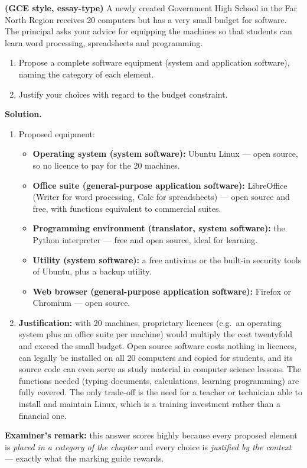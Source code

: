 \documentclass[11pt]{article}
\begin{document}
\begin{exoresolu}
\textbf{(GCE style, essay-type)} A newly created Government High School in the Far North Region receives 20 computers but has a very small budget for software. The principal asks your advice for equipping the machines so that students can learn word processing, spreadsheets and programming.
\begin{enumerate}
\item Propose a complete software equipment (system and application software), naming the category of each element.
\item Justify your choices with regard to the budget constraint.
\end{enumerate}
\tcblower
\textbf{Solution.}
\begin{enumerate}
\item Proposed equipment:
\begin{itemize}
\item \textbf{Operating system (system software):} Ubuntu Linux --- open source, so no licence to pay for the 20 machines.
\item \textbf{Office suite (general-purpose application software):} LibreOffice (Writer for word processing, Calc for spreadsheets) --- open source and free, with functions equivalent to commercial suites.
\item \textbf{Programming environment (translator, system software):} the Python interpreter --- free and open source, ideal for learning.
\item \textbf{Utility (system software):} a free antivirus or the built-in security tools of Ubuntu, plus a backup utility.
\item \textbf{Web browser (general-purpose application software):} Firefox or Chromium --- open source.
\end{itemize}
\item \textbf{Justification:} with 20 machines, proprietary licences (e.g.\ an operating system plus an office suite per machine) would multiply the cost twentyfold and exceed the small budget. Open source software costs nothing in licences, can legally be installed on all 20 computers and copied for students, and its source code can even serve as study material in computer science lessons. The functions needed (typing documents, calculations, learning programming) are fully covered. The only trade-off is the need for a teacher or technician able to install and maintain Linux, which is a training investment rather than a financial one.
\end{enumerate}
\textbf{Examiner's remark:} this answer scores highly because every proposed element is \emph{placed in a category of the chapter} and every choice is \emph{justified by the context} --- exactly what the marking guide rewards.
\end{exoresolu}
\end{document}
